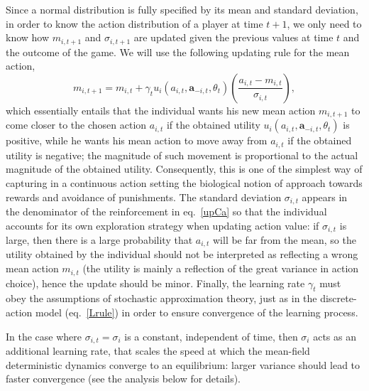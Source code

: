 \documentclass[11pt,reqno]{amsart}
\newcommand{\e}{\theta} %
\newcommand{\ac}{a} %
\newcommand{\va}{\mathbf{a}} %
\newcommand{\lr}{\gamma} %
\newcommand{\tm}{t}%
\newcommand{\pf}{u} %
\newcommand{\ma}{m} %
\newcommand{\sd}{\sigma} %
\begin{document}
Since a normal distribution is fully specified by its mean and standard deviation, in order to know the action distribution of a player at time $\tm+1$, we only need to know how $\ma_{i,\tm+1}$ and $\sd_{i,\tm+1}$ are updated given the previous values at time $\tm$ and the outcome of the game. We will use the following updating rule for the mean action,
\begin{equation}
\label{upCa}
\ma_{i,\tm+1} = \ma_{i,\tm} + \lr_\tm \pf_{i}(\ac_{i,\tm},\va_{-i,\tm},\e_\tm) \left( \frac{\ac_{i,\tm}- \ma_{i,\tm}}{\sd_{i,\tm}} \right),
\end{equation}
which essentially entails that the individual wants his new mean action $\ma_{i,\tm+1}$ to come closer to the chosen action $\ac_{i,\tm}$ if the obtained utility $\pf_{i}(\ac_{i,\tm},\va_{-i,\tm},\e_\tm)$ is positive, while he wants his mean action to move away from $\ac_{i,\tm}$ if the obtained utility is negative; the magnitude of such movement is proportional to the actual magnitude of the obtained utility. Consequently, this is one of the simplest way of capturing in a continuous action setting the biological notion of approach towards rewards and avoidance of punishments. %
The standard deviation $\sd_{i,\tm}$ appears in the denominator of the reinforcement in eq.~\ref{upCa} so that the individual accounts for its own exploration strategy when updating action value: if $\sd_{i,\tm}$ is large, then there is a large probability that $\ac_{i,\tm}$ will be far from the mean, so the utility obtained by the individual should not be interpreted as reflecting a wrong mean action $\ma_{i,\tm}$ (the utility is mainly a reflection of the great variance in action choice), hence the update should be minor. Finally, the learning rate $\lr_\tm$ must obey the assumptions of stochastic approximation theory, just as in the discrete-action model (eq.~\ref{Lrule}) in order to ensure convergence of the learning process.

In the case where $\sd_{i,\tm} = \sd_{i}$ is a constant, independent of time, then  $\sd_{i}$ acts as an additional learning rate, that scales the speed at which the mean-field deterministic dynamics converge to an equilibrium: larger variance should lead to faster convergence (see the analysis below for details).
\end{document}
